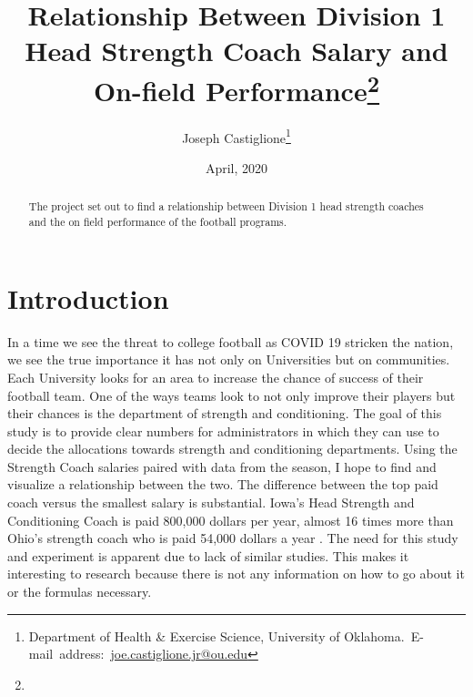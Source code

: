 \documentclass[12pt,english]{article}
\begin{document}
\begin{singlespace}
\title{Relationship Between Division 1 Head Strength Coach Salary and On-field Performance\thanks{}}
\end{singlespace}

\author{Joseph Castiglione\thanks{Department of Health & Exercise Science, University of Oklahoma.\
E-mail~address:~\href{mailto:joe.castiglione.jr@ou.edu}{joe.castiglione.jr@ou.edu}}}

\date{April, 2020}

\maketitle

\begin{abstract}
\begin{singlespace}
The project set out to find a relationship between Division 1 head strength coaches and the on field performance of the football programs. 
\end{singlespace}

\end{abstract}
\vfill{}


\pagebreak{}


\section{Introduction}\label{sec:intro}
    In a time we see the threat to college football as COVID 19 stricken the nation, we see the true importance it has not only on Universities but on communities. Each University looks for an area to increase the chance of success of their football team. One of the ways teams look to not only improve their players but their chances is the department of strength and conditioning. The goal of this study is to provide clear numbers for administrators in which they can use to decide the allocations towards strength and conditioning departments. Using the Strength Coach salaries paired with data from the season, I hope to find and visualize a relationship between the two. The difference between the top paid coach versus the smallest salary is substantial. Iowa's Head Strength and Conditioning Coach is paid 800,000 dollars per year, almost 16 times more than Ohio's strength coach who is paid 54,000 dollars a year \cite{gardner}. The need for this study and experiment is apparent due to lack of similar studies. This makes it interesting to research because there is not any information on how to go about it or the formulas necessary. 
     
\end{document}
